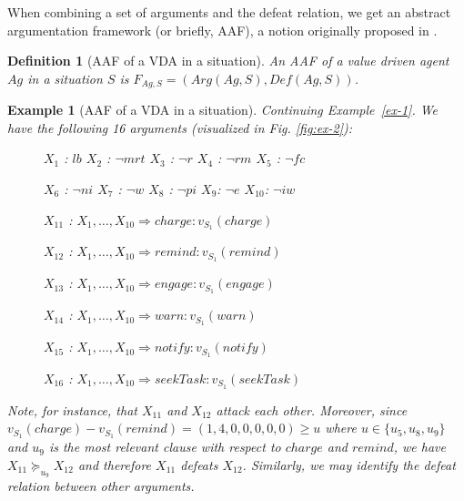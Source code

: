 \documentclass[letterpaper]{article} %
\newtheorem{definition}{Definition}
\newtheorem{example}{Example}
\begin{document}
When combining a set of arguments and the defeat relation, we get an abstract argumentation framework (or briefly, AAF), a notion originally proposed in \cite{DBLP:journals/ai/Dung95}. 

\begin{definition}[AAF of a VDA in a situation]
An AAF of a value driven agent $Ag$ in a situation $S$ is $F_{Ag, S} = (Arg(Ag, S), Def(Ag, S))$. 
\end{definition}

\begin{example}[AAF of a VDA in a situation]  \label{ex-2}
Continuing Example~\ref{ex-1}.  We have the following 16 arguments (visualized in Fig. \ref{fig:ex-2}):
\begin{description}
\item[]$X_{1}$ : $lb$\hspace{0.4cm} $X_{2}$ : $\neg mrt$ \hspace{0.15cm} $X_{3}$ : $\neg r$ \hspace{0.2cm} $X_{4}$ : $\neg rm$ \hspace{0.1cm} $X_{5}$ : $\neg fc$ 
\item[]$X_{6}$ : $\neg ni$ \hspace{0.05cm} $X_{7}$ : $\neg w$ \hspace{0.4cm} $X_{8}$ : $\neg pi$ \hspace{0.2cm} $X_{9}$: $\neg e$\hspace{0.48cm} $X_{10}$: $\neg iw$ 
\item[]$X_{11}$ : $X_1, \dots, X_{10} \Rightarrow charge: v_{S_1}(charge)$ 
\item[]$X_{12}$ : $X_1, \dots, X_{10} \Rightarrow remind: v_{S_1}(remind)$
\item[]$X_{13}$ : $X_1, \dots, X_{10} \Rightarrow engage: v_{S_1}(engage)$ 
\item[]$X_{14}$ : $X_1, \dots, X_{10} \Rightarrow warn: v_{S_1}(warn)$
\item[]$X_{15}$ : $X_1, \dots, X_{10} \Rightarrow notify: v_{S_1}(notify)$ 
\item[]$X_{16}$ : $X_1, \dots, X_{10} \Rightarrow seekTask: v_{S_1}(seekTask)$
\end{description}
Note, for instance, that $X_{11}$ and $X_{12}$ attack each other.
Moreover, since $v_{S_1}(charge) - v_{S_1}(remind) = (1, 4, 0, 0, 0, 0, 0) \ge u$ where $u\in \{u_5,u_8,u_9\}$ and $u_9$ is the most relevant clause with respect to $charge$ and $remind$, we have $X_{11} \succeq_{u_9} X_{12}$ and therefore $X_{11}$ defeats $X_{12}$. Similarly, we may identify the defeat relation between other arguments. 

\end{example}
\end{document}
